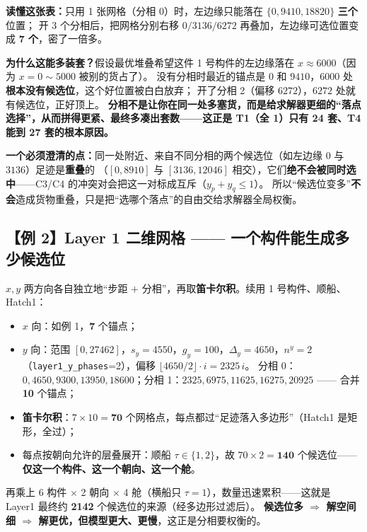 \documentclass[11pt]{ctexart}
\newcommand{\code}[1]{\texttt{#1}}
\begin{document}
\textbf{读懂这张表：}只用 1 张网格（分相 0）时，左边缘只能落在 $\{0,9410,18820\}$ \textbf{三个}位置；
开 3 个分相后，把网格分别右移 $0/3136/6272$ 再叠加，左边缘可选位置变成 \textbf{7 个}，密了一倍多。
\begin{key}\textbf{为什么这能多装套？}假设最优堆叠希望这件 1 号构件的左边缘落在 $x\approx6000$（因为 $x{=}0\!\sim\!5000$ 被别的货占了）。
没有分相时最近的锚点是 $0$ 和 $9410$，$6000$ 处\textbf{根本没有候选位}，这个好位置被白白放弃；
开了分相 2（偏移 $6272$），$6272$ 处就有候选位，正好顶上。
\textbf{分相不是让你在同一处多塞货，而是给求解器更细的“落点选择”，从而拼得更紧、最终多凑出套数——这正是 T1（全 1）只有 24 套、T4 能到 27 套的根本原因。}
\end{key}

\textbf{一个必须澄清的点：}同一处附近、来自不同分相的两个候选位（如左边缘 $0$ 与 $3136$）足迹是\textbf{重叠}的
（$[0,8910]$ 与 $[3136,12046]$ 相交），它们\textbf{绝不会被同时选中}——C3/C4 的冲突对会把这一对标成互斥（$y_p+y_q\le1$）。
所以“候选位变多”\textbf{不会}造成货物重叠，只是把“选哪个落点”的自由交给求解器全局权衡。

\subsection{【例 2】Layer 1 二维网格 —— 一个构件能生成多少候选位}
$x,y$ 两方向各自独立地“步距 $+$ 分相”，再取\textbf{笛卡尔积}。续用 1 号构件、顺船、Hatch1：
\begin{itemize}[leftmargin=1.8em,itemsep=1pt]
  \item $x$ 向：如例 1，\textbf{7} 个锚点；
  \item $y$ 向：范围 $[0,27462]$，$s_y=4550$，$g_y=100$，$\Delta_y=4650$，$n^y=2$（\code{layer1\_y\_phases}=2），偏移 $\lfloor4650/2\rfloor\cdot i=2325\,i$。
        分相 0：$0,4650,9300,13950,18600$；分相 1：$2325,6975,11625,16275,20925$ —— 合并 \textbf{10} 个锚点；
  \item \textbf{笛卡尔积}：$7\times10=\mathbf{70}$ 个网格点，每点都过“足迹落入多边形”（Hatch1 是矩形，全过）；
  \item 每点按朝向允许的层叠展开：顺船 $\tau\in\{1,2\}$，故 $70\times2=\mathbf{140}$ 个候选位——\textbf{仅这一个构件、这一个朝向、这一个舱}。
\end{itemize}
再乘上 6 构件 $\times$ 2 朝向 $\times$ 4 舱（横船只 $\tau{=}1$），数量迅速累积——这就是 Layer1 最终约 \textbf{2142} 个候选位的来源（经多边形过滤后）。
\textbf{候选位多 $\Rightarrow$ 解空间细 $\Rightarrow$ 解更优，但模型更大、更慢}，这正是分相要权衡的。
\end{document}
